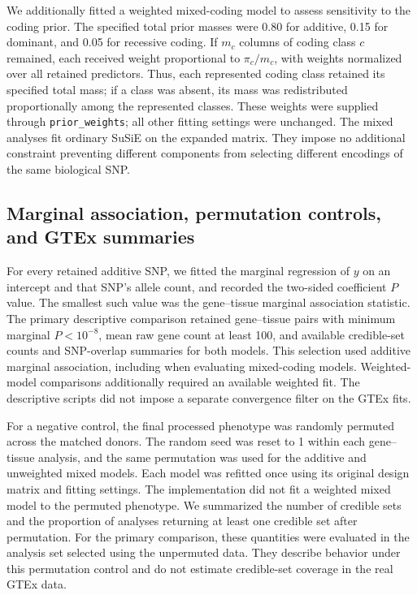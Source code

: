 \documentclass[12pt]{article}
\begin{document}
We additionally fitted a weighted mixed-coding model to assess sensitivity
to the coding prior. The specified total prior masses were 0.80 for
additive, 0.15 for dominant, and 0.05 for recessive coding. If $m_c$ columns
of coding class $c$ remained, each received weight proportional to
$\pi_c/m_c$, with weights normalized over all retained predictors.
Thus, each represented coding class retained its specified total mass;
if a class was absent, its mass was redistributed proportionally among
the represented classes. These weights were supplied through
\texttt{prior\_weights}; all other fitting settings were unchanged.
The mixed analyses fit ordinary SuSiE on the expanded matrix. They impose
no additional constraint preventing different components from selecting
different encodings of the same biological SNP.

\subsection{Marginal association, permutation controls, and GTEx summaries}
For every retained additive SNP, we fitted the marginal regression of
$y$ on an intercept and that SNP's allele count, and recorded the
two-sided coefficient $P$ value. The smallest such value was the
gene--tissue marginal association statistic. The primary descriptive
comparison retained gene--tissue pairs with minimum marginal $P<10^{-8}$,
mean raw gene count at least 100, and available credible-set counts and
SNP-overlap summaries for both models. This selection used additive
marginal association, including when evaluating mixed-coding models.
Weighted-model comparisons additionally required an available weighted
fit. The descriptive scripts did not impose a separate convergence
filter on the GTEx fits.

For a negative control, the final processed phenotype was randomly
permuted across the matched donors. The random seed was reset to 1
within each gene--tissue analysis, and the same permutation was used
for the additive and unweighted mixed models. Each model was refitted
once using its original design matrix and fitting settings. The
implementation did not fit a weighted mixed model to the permuted
phenotype. We summarized the number of credible sets and the proportion
of analyses returning at least one credible set after permutation.
For the primary comparison, these quantities were evaluated in the
analysis set selected using the unpermuted data. They describe behavior
under this permutation control and do not estimate credible-set
coverage in the real GTEx data.
\end{document}
